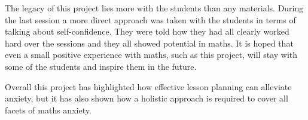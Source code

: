 \documentclass[11pt, a4paper, notitlepage]{article}
\begin{document}
The legacy of this project lies more with the students than any materials. During the last session a more direct approach was taken with the students in terms of talking about self-confidence. They were told how they had all clearly worked hard over the sessions and they all showed potential in maths. It is hoped that even a small positive experience with maths, such as this project, will stay with some of the students and inspire them in the future.
\par
Overall this project has highlighted how effective lesson planning can alleviate anxiety, but it has also shown how a holistic approach is required to cover all facets of maths anxiety.



\end{document}
